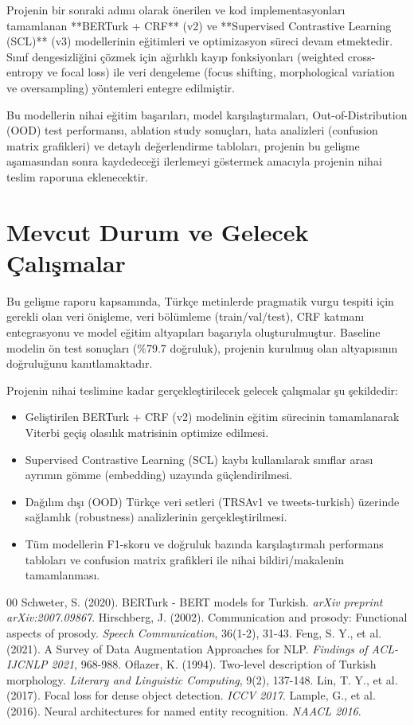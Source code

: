 \documentclass[conference]{IEEEtran}
\begin{document}
Projenin bir sonraki adımı olarak önerilen ve kod implementasyonları tamamlanan **BERTurk + CRF** (v2) ve **Supervised Contrastive Learning (SCL)** (v3) modellerinin eğitimleri ve optimizasyon süreci devam etmektedir. Sınıf dengesizliğini çözmek için ağırlıklı kayıp fonksiyonları (weighted cross-entropy ve focal loss) ile veri dengeleme (focus shifting, morphological variation ve oversampling) yöntemleri entegre edilmiştir.

Bu modellerin nihai eğitim başarıları, model karşılaştırmaları, Out-of-Distribution (OOD) test performansı, ablation study sonuçları, hata analizleri (confusion matrix grafikleri) ve detaylı değerlendirme tabloları, projenin bu gelişme aşamasından sonra kaydedeceği ilerlemeyi göstermek amacıyla projenin nihai teslim raporuna eklenecektir.

\section{Mevcut Durum ve Gelecek Çalışmalar}

Bu gelişme raporu kapsamında, Türkçe metinlerde pragmatik vurgu tespiti için gerekli olan veri önişleme, veri bölümleme (train/val/test), CRF katmanı entegrasyonu ve model eğitim altyapıları başarıyla oluşturulmuştur. Baseline modelin ön test sonuçları (\%79.7 doğruluk), projenin kurulmuş olan altyapısının doğruluğunu kanıtlamaktadır.

Projenin nihai teslimine kadar gerçekleştirilecek gelecek çalışmalar şu şekildedir:
\begin{itemize}
    \item Geliştirilen BERTurk + CRF (v2) modelinin eğitim sürecinin tamamlanarak Viterbi geçiş olasılık matrisinin optimize edilmesi.
    \item Supervised Contrastive Learning (SCL) kaybı kullanılarak sınıflar arası ayrımın gömme (embedding) uzayında güçlendirilmesi.
    \item Dağılım dışı (OOD) Türkçe veri setleri (TRSAv1 ve tweets-turkish) üzerinde sağlamlık (robustness) analizlerinin gerçekleştirilmesi.
    \item Tüm modellerin F1-skoru ve doğruluk bazında karşılaştırmalı performans tabloları ve confusion matrix grafikleri ile nihai bildiri/makalenin tamamlanması.
\end{itemize}

\begin{thebibliography}{00}
 Schweter, S. (2020). BERTurk - BERT models for Turkish. \textit{arXiv preprint arXiv:2007.09867}.
 Hirschberg, J. (2002). Communication and prosody: Functional aspects of prosody. \textit{Speech Communication}, 36(1-2), 31-43.
 Feng, S. Y., et al. (2021). A Survey of Data Augmentation Approaches for NLP. \textit{Findings of ACL-IJCNLP 2021}, 968-988.
 Oflazer, K. (1994). Two-level description of Turkish morphology. \textit{Literary and Linguistic Computing}, 9(2), 137-148.
 Lin, T. Y., et al. (2017). Focal loss for dense object detection. \textit{ICCV 2017}.
 Lample, G., et al. (2016). Neural architectures for named entity recognition. \textit{NAACL 2016}.
\end{thebibliography}
\end{document}
